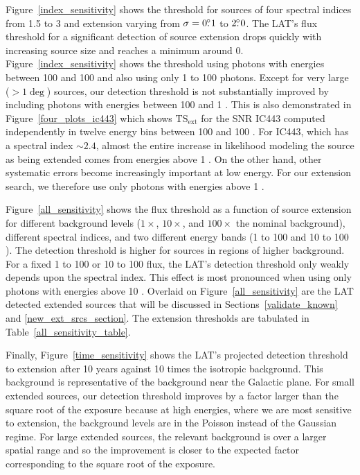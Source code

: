 \documentclass[12pt,preprint]{aastex}
\newcommand{\mev}{\text{MeV}\xspace}
\newcommand{\gev}{\text{GeV}\xspace}
\newcommand{\tsext}{{\ensuremath{\text{TS}_{\text{ext}}}}\xspace}
\newcommand{\hl}[1]{#1}
\begin{document}
Figure~\ref{index_sensitivity} shows the threshold for sources of four
spectral indices from 1.5 to 3 and extension varying from $\sigma=0\mbox{$.\!\!^\circ$}1$
to $2\mbox{$.\!\!^\circ$}0$.  The LAT's flux threshold for a significant detection
of source extension drops quickly with
increasing source size and reaches a minimum around 0. 
Figure~\ref{index_sensitivity} shows
the threshold using photons with energies between 100 \mev and 100 \gev
and also using only 1 \gev to 100 \gev photons.
Except for very large ($>1\deg$) sources, our detection threshold is
not substantially improved by including photons with energies between 100 \mev and
1 \gev.  This is also demonstrated in Figure~\ref{four_plots_ic443}
which shows \tsext for the SNR IC443 computed independently in twelve
energy bins between 100 \mev and 100 \gev. For IC443, which has a
spectral index $\sim2.4$, almost the entire increase in likelihood
modeling the source as being extended comes
from energies above 1 \gev.  On the other hand, other systematic errors
become increasingly important at low energy. For our extension search,
we therefore use only photons with energies above 1 \gev.

\hl{
Figure~\ref{all_sensitivity} shows the flux threshold
as a function of source extension for different background levels 
($1\times$,
$10\times$, 
and $100\times$ the nominal background), different spectral indices, and
two different energy bands (1 \gev to 100 \gev and 10 \gev to 100 \gev).  The detection
threshold is higher for sources in regions of higher background.  For a
fixed 1 \gev to 100 \gev or 10 \gev to 100 \gev flux, the LAT's detection threshold
only weakly depends upon the spectral index.  This effect is most
pronounced when using only photons with energies above 10 \gev.  Overlaid
on Figure~\ref{all_sensitivity} are the LAT detected extended sources
that will be discussed in Sections~\ref{validate_known}
and \ref{new_ext_srcs_section}.  The extension thresholds are tabulated
in Table~\ref{all_sensitivity_table}.

Finally, Figure~\ref{time_sensitivity} shows the LAT's projected
detection threshold to extension after 10 years against 10 times
the isotropic background. This background is representative of the
background near the Galactic plane.  For small extended sources, our
detection threshold improves by a factor larger than the square root
of the exposure because at high energies, where we are most sensitive
to extension, the background levels are in the Poisson instead of the
Gaussian regime.  For large extended sources, the relevant background
is over a larger spatial range and so the improvement is closer to the
expected factor corresponding to the square root of the exposure.
}
\end{document}
